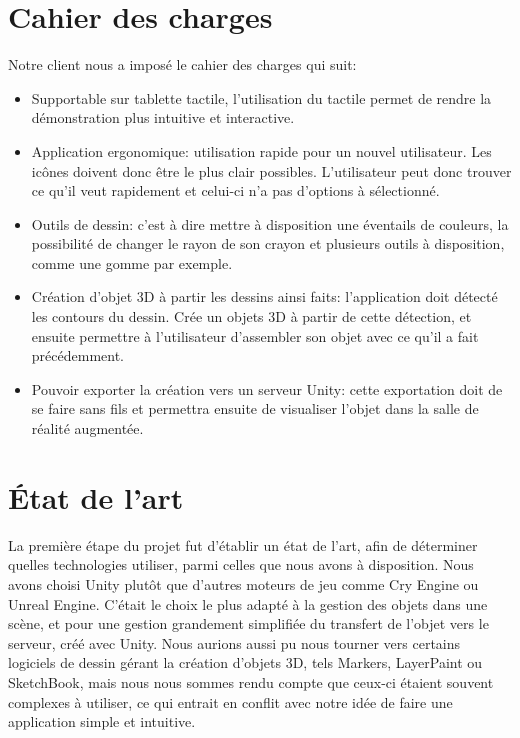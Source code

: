 \documentclass[a4paper,11pt]{article}
\begin{document}
	\section{Cahier des charges} %
		Notre client nous a imposé le cahier des charges qui suit:
		\begin{itemize}
			\item Supportable sur tablette tactile, l'utilisation du tactile permet de rendre la démonstration plus intuitive et interactive.
			\item Application ergonomique: utilisation rapide pour un nouvel utilisateur. Les icônes doivent donc être le plus clair possibles. L'utilisateur peut donc trouver ce qu'il veut rapidement et celui-ci n'a pas d'options à sélectionné.
			\item Outils de dessin: c'est à dire mettre à disposition une éventails de couleurs, la possibilité de changer le rayon de son crayon et plusieurs outils à disposition, comme une gomme par exemple.
			\item Création d'objet 3D à partir les dessins ainsi faits: l'application doit détecté les contours du dessin. Crée un objets 3D à partir de cette détection, et ensuite permettre à l'utilisateur d'assembler son objet avec ce qu'il a fait précédemment.
			\item Pouvoir exporter la création vers un serveur Unity: cette exportation doit de se faire sans fils et permettra ensuite de visualiser l'objet dans la salle de réalité augmentée.
		\end{itemize}

	\section{État de l'art} %
		La première étape du projet fut d'établir un état de l'art, afin de déterminer quelles technologies utiliser, parmi celles que nous avons à disposition. Nous avons choisi Unity plutôt que d'autres moteurs de jeu comme Cry Engine ou Unreal Engine. C'était le choix le plus adapté à la gestion des objets dans une scène, et pour une gestion grandement simplifiée du transfert de l'objet vers le serveur, créé avec Unity. Nous aurions aussi pu nous tourner vers certains logiciels de dessin gérant la création d'objets 3D, tels Markers, LayerPaint ou SketchBook, mais nous nous sommes rendu compte que ceux-ci étaient souvent complexes à utiliser, ce qui entrait en conflit avec notre idée de faire une application simple et intuitive.
		
\end{document}
